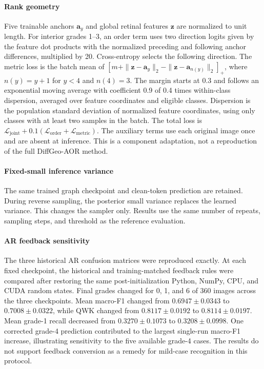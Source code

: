 \documentclass[a4paper,fleqn]{cas-sc}
\begin{document}
\paragraph{Rank geometry}
Five trainable anchors $\mathbf a_y$ and global retinal features $\mathbf z$ are normalized to unit length. For interior grades 1--3, an order term uses two direction logits given by the feature dot products with the normalized preceding and following anchor differences, multiplied by 20. Cross-entropy selects the following direction. The metric loss is the batch mean of $[m+\|\mathbf{z}-\mathbf{a}_y\|_2-\|\mathbf{z}-\mathbf{a}_{n(y)}\|_2]_+$, where $n(y)=y+1$ for $y<4$ and $n(4)=3$. The margin starts at 0.3 and follows an exponential moving average with coefficient 0.9 of 0.4 times within-class dispersion, averaged over feature coordinates and eligible classes. Dispersion is the population standard deviation of normalized feature coordinates, using only classes with at least two samples in the batch. The total loss is $\mathcal{L}_{\mathrm{joint}}+0.1(\mathcal{L}_{\mathrm{order}}+\mathcal{L}_{\mathrm{metric}})$. The auxiliary terms use each original image once and are absent at inference. This is a component adaptation, not a reproduction of the full DiffGeo-AOR method.

\paragraph{Fixed-small inference variance}
The same trained graph checkpoint and clean-token prediction are retained. During reverse sampling, the posterior small variance replaces the learned variance. This changes the sampler only. Results use the same number of repeats, sampling steps, and threshold as the reference evaluation.

\paragraph{AR feedback sensitivity}
The three historical AR confusion matrices were reproduced exactly. At each fixed checkpoint, the historical and training-matched feedback rules were compared after restoring the same post-initialization Python, NumPy, CPU, and CUDA random states. Final grades changed for 0, 1, and 6 of 360 images across the three checkpoints. Mean macro-F1 changed from $0.6947\pm0.0343$ to $0.7008\pm0.0322$, while QWK changed from $0.8117\pm0.0192$ to $0.8114\pm0.0197$. Mean grade-1 recall decreased from $0.3270\pm0.1073$ to $0.3208\pm0.0998$. One corrected grade-4 prediction contributed to the largest single-run macro-F1 increase, illustrating sensitivity to the five available grade-4 cases. The results do not support feedback conversion as a remedy for mild-case recognition in this protocol.



\end{document}
